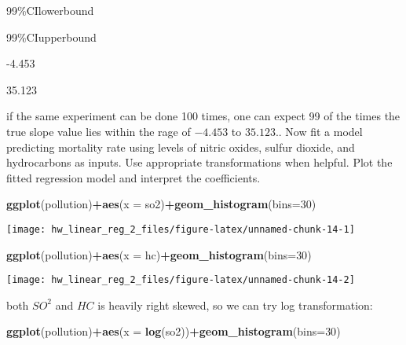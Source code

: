 \documentclass[]{article}
\newenvironment{Shaded}{\begin{snugshade}}{\end{snugshade}}
\newcommand{\DataTypeTok}[1]{\textcolor[rgb]{0.13,0.29,0.53}{#1}}
\newcommand{\DecValTok}[1]{\textcolor[rgb]{0.00,0.00,0.81}{#1}}
\newcommand{\KeywordTok}[1]{\textcolor[rgb]{0.13,0.29,0.53}{\textbf{#1}}}
\newcommand{\NormalTok}[1]{#1}
\newcommand{\OperatorTok}[1]{\textcolor[rgb]{0.81,0.36,0.00}{\textbf{#1}}}
\begin{document}
99\%CIlowerbound

99\%CIupperbound

-4.453

35.123

if the same experiment can be done 100 times, one can expect 99 of the
times the true slope value lies within the rage of \(-4.453\) to
\(35.123\).. Now fit a model predicting mortality rate using
levels of nitric oxides, sulfur dioxide, and hydrocarbons as inputs. Use
appropriate transformations when helpful. Plot the fitted regression
model and interpret the coefficients.

\begin{Shaded}
\begin{Highlighting}[]
\KeywordTok{ggplot}\NormalTok{(pollution)}\OperatorTok{+}\KeywordTok{aes}\NormalTok{(}\DataTypeTok{x =}\NormalTok{ so2)}\OperatorTok{+}\KeywordTok{geom_histogram}\NormalTok{(}\DataTypeTok{bins=}\DecValTok{30}\NormalTok{)}
\end{Highlighting}
\end{Shaded}

\begin{center}\texttt{[image: hw\_linear\_reg\_2\_files/figure-latex/unnamed-chunk-14-1]} \end{center}

\begin{Shaded}
\begin{Highlighting}[]
\KeywordTok{ggplot}\NormalTok{(pollution)}\OperatorTok{+}\KeywordTok{aes}\NormalTok{(}\DataTypeTok{x =}\NormalTok{ hc)}\OperatorTok{+}\KeywordTok{geom_histogram}\NormalTok{(}\DataTypeTok{bins=}\DecValTok{30}\NormalTok{)}
\end{Highlighting}
\end{Shaded}

\begin{center}\texttt{[image: hw\_linear\_reg\_2\_files/figure-latex/unnamed-chunk-14-2]} \end{center}

both \(SO^2\) and \(HC\) is heavily right skewed, so we can try log
transformation:

\begin{Shaded}
\begin{Highlighting}[]
\KeywordTok{ggplot}\NormalTok{(pollution)}\OperatorTok{+}\KeywordTok{aes}\NormalTok{(}\DataTypeTok{x =} \KeywordTok{log}\NormalTok{(so2))}\OperatorTok{+}\KeywordTok{geom_histogram}\NormalTok{(}\DataTypeTok{bins=}\DecValTok{30}\NormalTok{)}
\end{Highlighting}
\end{Shaded}
\end{document}
